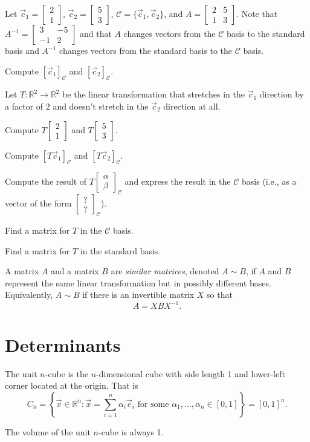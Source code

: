 \documentclass{problemset}
\newcommand{\R}{\mathbb{R}}
\newcommand{\mat}[1]{\begin{bmatrix}#1\end{bmatrix}}
\begin{document}
	\question
	Let $\vec c_1=\mat{2\\1}$, $\vec c_2=\mat{5\\3}$, $\mathcal C=\{\vec c_1,\vec c_2\}$, and $A=\mat{2&5\\1&3}$.
	Note that $A^{-1}=\mat{3&-5\\-1&2}$ and that $A$ changes vectors from the $\mathcal C$ basis to the standard
	basis and $A^{-1}$ changes vectors from the standard basis to the $\mathcal C$ basis.
	\begin{parts}
		\item Compute $[\vec c_1]_{\mathcal C}$ and $[\vec c_2]_{\mathcal C}$.
	\end{parts}
	Let $T:\R^2\to\R^2$ be the linear transformation that stretches in the $\vec c_1$ direction by a factor of $2$
	and doesn't stretch in the $\vec c_2$ direction at all.
	\begin{parts}[resume]
		\item Compute $T\mat{2\\1}$ and $T\mat{5\\3}$.
		\item Compute $[T\vec c_1]_{\mathcal C}$ and $[T\vec c_2]_{\mathcal C}$.
		\item Compute the result of $T\mat{\alpha\\\beta}_{\mathcal C}$ and express the result in the
			$\mathcal C$ basis (i.e., as a vector of the form $\mat{?\\?}_{\mathcal C}$).
		\item Find a matrix for $T$ in the $\mathcal C$ basis.
		\item Find a matrix for $T$ in the standard basis.
	\end{parts}
	\begin{definition}
		A matrix $A$ and a matrix $B$ are \emph{similar matrices}, denoted $A\sim B$, if
		$A$ and $B$ represent the same linear transformation but in possibly different bases.
		Equivalently, $A\sim B$ if there is an invertible matrix $X$ so that
		\[
			A=XBX^{-1}.
		\]
	\end{definition}



\newpage
\section*{Determinants}
	\begin{definition}
		The unit $n$-cube is the $n$-dimensional cube with side length 1 and lower-left
		corner located at the origin.  That is 
		\[
			C_n = \left\{\vec x\in\R^n:\vec x=\sum_{i=1}^n \alpha_i\vec e_i\text{ for some }\alpha_1,\ldots,\alpha_n\in[0,1]\right\}=[0,1]^n.
		\]
	\end{definition}
	The volume of the unit $n$-cube is always 1.
\end{document}
